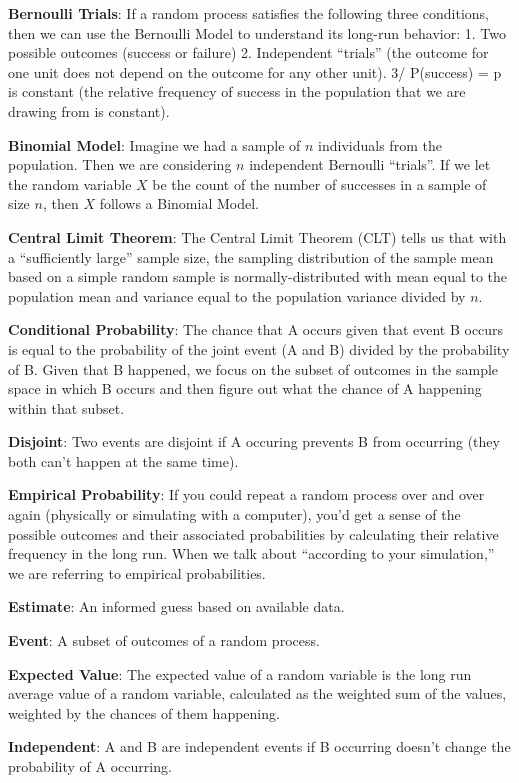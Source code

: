 \documentclass[
]{book}
\begin{document}
\textbf{Bernoulli Trials}: If a random process satisfies the following three conditions, then we can use the Bernoulli Model to understand its long-run behavior: 1. Two possible outcomes (success or failure) 2. Independent ``trials'' (the outcome for one unit does not depend on the outcome for any other unit). 3/ P(success) = p is constant (the relative frequency of success in the population that we are drawing from is constant).

\textbf{Binomial Model}: Imagine we had a sample of \(n\) individuals from the population. Then we are considering \(n\) independent Bernoulli ``trials''. If we let the random variable \(X\) be the count of the number of successes in a sample of size \(n\), then \(X\) follows a Binomial Model.

\textbf{Central Limit Theorem}: The Central Limit Theorem (CLT) tells us that with a ``sufficiently large'' sample size, the sampling distribution of the sample mean based on a simple random sample is normally-distributed with mean equal to the population mean and variance equal to the population variance divided by \(n\).

\textbf{Conditional Probability}: The chance that A occurs given that event B occurs is equal to the probability of the joint event (A and B) divided by the probability of B. Given that B happened, we focus on the subset of outcomes in the sample space in which B occurs and then figure out what the chance of A happening within that subset.

\textbf{Disjoint}: Two events are disjoint if A occuring prevents B from occurring (they both can't happen at the same time).

\textbf{Empirical Probability}: If you could repeat a random process over and over again (physically or simulating with a computer), you'd get a sense of the possible outcomes and their associated probabilities by calculating their relative frequency in the long run. When we talk about ``according to your simulation,'' we are referring to empirical probabilities.

\textbf{Estimate}: An informed guess based on available data.

\textbf{Event}: A subset of outcomes of a random process.

\textbf{Expected Value}: The expected value of a random variable is the long run average value of a random variable, calculated as the weighted sum of the values, weighted by the chances of them happening.

\textbf{Independent}: A and B are independent events if B occurring doesn't change the probability of A occurring.
\end{document}
